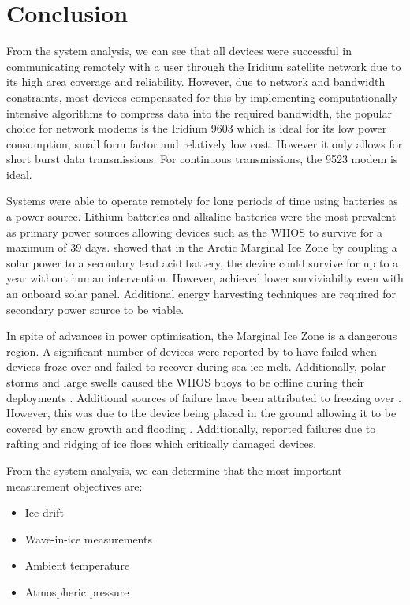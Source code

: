 \section{Conclusion}

From the system analysis, we can see that all devices were successful in communicating remotely with a user through the Iridium satellite network due to its high area coverage and reliability. However, due to network and bandwidth constraints, most devices compensated for this by implementing computationally intensive algorithms to compress data into the required bandwidth, the popular choice for network modems is the Iridium 9603 which is ideal for its low power consumption, small form factor and relatively low cost. However it only allows for short burst data transmissions. For continuous transmissions, the 9523 modem is ideal. \par 

Systems were able to operate remotely for long periods of time using batteries as a power source. Lithium batteries and alkaline batteries were the most prevalent as primary power sources allowing devices such as the WIIOS to survive for a maximum of 39 days. \textcite{doble2017robust} showed that in the Arctic Marginal Ice Zone by coupling a solar power to a secondary lead acid battery, the device could survive for up to a year without human intervention. However, \textcite{rabault2020development} achieved lower surviviabilty even with an onboard solar panel. Additional energy harvesting techniques are required for secondary power source to be viable. \par 

In spite of advances in power optimisation, the Marginal Ice Zone is a dangerous region. A significant number of devices were reported by \textcite{doble2017robust} to have failed when devices froze over and failed to recover during sea ice melt. Additionally, polar storms and large swells caused the WIIOS buoys to be offline during their deployments \cite{kohout2015device,alberello2019drift}. Additional sources of failure have been attributed to freezing over \textcite{rabault2018investigation}. However, this was due to the device being placed in the ground allowing it to be covered by snow growth and flooding \cite{barber2005microwave}. Additionally, \textcite{rabault2019open} reported failures due to rafting and ridging of ice floes which critically damaged devices.\par 

From the system analysis, we can determine that the most important measurement objectives are:
\begin{itemize}
	\item Ice drift
	\item Wave-in-ice measurements
	\item Ambient temperature
	\item Atmospheric pressure
\end{itemize}

